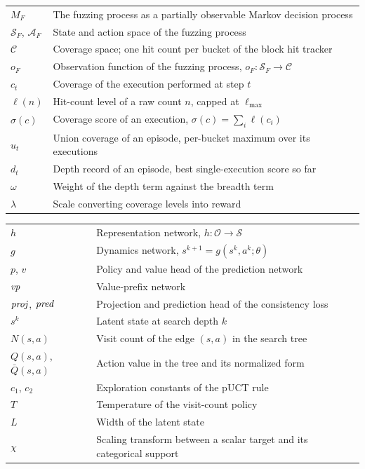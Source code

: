 
\begin{tabular}{p{2.5cm} p{11cm}}
$M_F$ & The fuzzing process as a partially observable Markov decision process \\
$\mathcal{S}_F$, $\mathcal{A}_F$ & State and action space of the fuzzing process \\
$\mathcal{C}$ & Coverage space; one hit count per bucket of the block hit tracker \\
$o_F$ & Observation function of the fuzzing process, $o_F:\mathcal{S}_F\to\mathcal{C}$ \\
$c_t$ & Coverage of the execution performed at step $t$ \\
$\ell(n)$ & Hit-count level of a raw count $n$, capped at $\ell_{\max}$ \\
$\sigma(c)$ & Coverage score of an execution, $\sigma(c)=\sum_i\ell(c_i)$ \\
$u_t$ & Union coverage of an episode, per-bucket maximum over its executions \\
$d_t$ & Depth record of an episode, best single-execution score so far \\
$\omega$ & Weight of the depth term against the breadth term \\
$\lambda$ & Scale converting coverage levels into reward \\
\end{tabular}


\begin{tabular}{p{2.5cm} p{11cm}}
$h$ & Representation network, $h:\mathcal{O}\to\mathcal{S}$ \\
$g$ & Dynamics network, $s^{k+1}=g(s^k,a^k;\theta)$ \\
$p$, $v$ & Policy and value head of the prediction network \\
$\mathit{vp}$ & Value-prefix network \\
$\mathit{proj}$, $\mathit{pred}$ & Projection and prediction head of the consistency loss \\
$s^k$ & Latent state at search depth $k$ \\
$N(s,a)$ & Visit count of the edge $(s,a)$ in the search tree \\
$Q(s,a)$, $\bar{Q}(s,a)$ & Action value in the tree and its normalized form \\
$c_1$, $c_2$ & Exploration constants of the pUCT rule \\
$T$ & Temperature of the visit-count policy \\
$L$ & Width of the latent state \\
$\chi$ & Scaling transform between a scalar target and its categorical support \\
\end{tabular}

